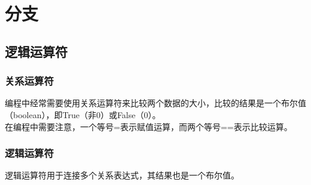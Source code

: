 \chapter{分支}

\section{逻辑运算符}

\subsection{关系运算符}

编程中经常需要使用关系运算符来比较两个数据的大小，比较的结果是一个布尔值（boolean），即True（非0）或False（0）。\\

在编程中需要注意，一个等号=表示赋值运算，而两个等号==表示比较运算。\\

\begin{table}[H]
	\centering
	\caption{关系运算符}
\end{table}

\vspace{0.5cm}

\subsection{逻辑运算符}

逻辑运算符用于连接多个关系表达式，其结果也是一个布尔值。\\

